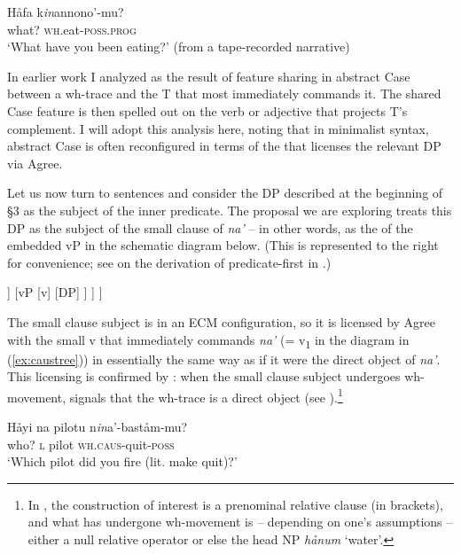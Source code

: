 \documentclass[output=paper,
modfonts
]{LSP/langsci}
\begin{document}
\begin{exe}
\begin{xlist}
\ex \label{ex:chung:30b} \gll Håfa k\emph{in}annono'-mu?\\
what? \textsc{wh.}eat-\textsc{poss.prog}\\
\glt `What have you been eating?' (from a tape-recorded narrative)
\z
\z

In earlier work I analyzed  as the result of feature sharing
in abstract Case between a wh-trace and the T that most immediately
commands it. The shared Case feature is then spelled out on the verb or
adjective that projects T's complement. I will adopt this analysis here,
noting that in minimalist syntax, abstract Case is often reconfigured in
terms of the  that licenses the relevant DP via Agree.

Let us now turn to  sentences and consider the DP described at
the beginning of \S3 as the subject of the inner predicate. The
proposal we are exploring treats this DP as the subject of the small
clause  of \emph{na'} -- in other words, as the  of
the embedded vP in the schematic diagram below. (This  is
represented to the right for convenience; see \citealt{chung1998} on the
derivation of predicate-first  in .)

\ea \label{ex:chung:31}\label{ex:caustree}
	\begin{forest}
		[v\1
			[v\sub{1}]
			[VP
				[V
					[na']
				]
				[vP
					[v\1
						[v\sub{2}]
						[VP]
					]
					[DP]
				]
			]
		]
	\end{forest}
\z

The small clause subject is in an ECM configuration, so it is licensed
by Agree with the small v that immediately commands \emph{na'} (=
v\textsubscript{1} in the diagram in (\ref{ex:caustree})) in essentially the same way
as if it were the direct object of \emph{na'}. This licensing is
confirmed by : when the small clause subject undergoes
wh-movement,  signals that the wh-trace is a direct object
(see \citealt[82, 164]{gibson1980}).\footnote{In , the construction of
  interest is a prenominal relative clause (in brackets), and what has
  undergone wh-movement is -- depending on one's assumptions -- either a
  null relative operator or else the head NP \emph{hånum} `water'.}

\ea \label{ex:chung:32}
\ea \label{ex:chung:32a}
\gll Håyi na pilotu n\emph{in}a'-baståm-mu?\\
who? \textsc{l} pilot \textsc{wh.caus}-quit-\textsc{poss}\\
\glt `Which pilot did you fire (lit. make quit)?'


\end{xlist}
\end{exe}
\end{document}
